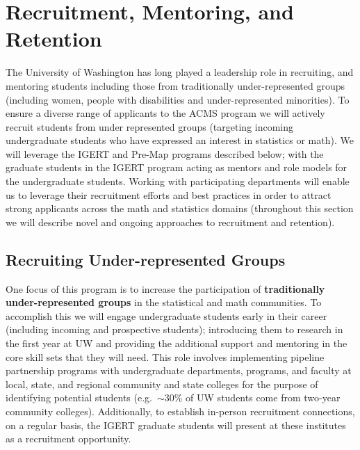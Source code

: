  \section{Recruitment, Mentoring, and Retention}

 The University of Washington has long played a leadership role in
 recruiting, and mentoring students including those from traditionally
 under-represented groups (including women, people with disabilities
 and under-represented minorities). To ensure a diverse range of
 applicants to the ACMS program we will actively recruit students from
 under represented groups (targeting incoming undergraduate students
 who have expressed an interest in statistics or math).  We will
 leverage the IGERT and Pre-Map programs described below; with the
 graduate students in the IGERT program acting as mentors and role
 models for the undergraduate students. Working with participating
 departments will enable us to leverage their recruitment efforts and
 best practices in order to attract strong applicants across the math
 and statistics domains (throughout this section we will describe
 novel and ongoing approaches to recruitment and retention).


\subsection{Recruiting Under-represented Groups}
 
One focus of this program is to increase the participation of
\textbf{traditionally under-represented groups} in the statistical and
math communities. To accomplish this we will engage undergraduate
students early in their career (including incoming and prospective
students); introducing them to research in the first year at UW and
providing the additional support and mentoring in the core skill sets
that they will need.  This role involves implementing pipeline
partnership programs with undergraduate departments, programs, and
faculty at local, state, and regional community and state colleges for
the purpose of identifying potential students (e.g.\ $\sim$30\% of UW
students come from two-year community colleges). Additionally, to
establish in-person recruitment connections, on a regular basis, the
IGERT graduate students will present at these institutes as a
recruitment opportunity.


